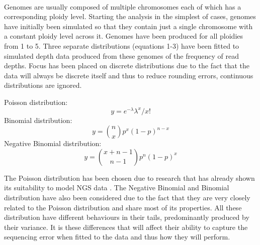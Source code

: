 \documentclass[11pt]{article}
\begin{document}
\paragraph{}Genomes are usually composed of multiple chromosomes each of which has a corresponding ploidy level. Starting the analysis in the simplest of cases, genomes have initially been simulated so that they contain just a single chromosome with a constant ploidy level across it. Genomes have been produced for all ploidies from 1 to 5. Three separate distributions (equations 1-3) have been fitted to simulated depth data produced from these genomes of the frequency of read depths. Focus has been placed on discrete distributions due to the fact that the data will always be discrete itself and thus to reduce rounding errors, continuous distributions are ignored.
\begin{center}
Poisson distribution:
\begin{equation}
y=e^{-\lambda}\lambda^{x}/x!
\end{equation}
Binomial distribution:
\begin{equation}
y=\binom{n}{x}p^{x}(1-p)^{n-x}
\end{equation}
Negative Binomial distribution:
\begin{equation}
y=\binom{x+n-1}{n-1}p^{n}(1-p)^{x}
\end{equation}
\end{center}
The Poisson distribution has been chosen due to research that has already shown its suitability to model NGS data \autocite{Schwarzbauer2010}. The Negative Binomial and Binomial distribution have also been considered due to the fact that they are very closely related to the Poisson distribution and share most of its properties. All these distribution have different behaviours in their tails, predominantly produced by their variance. It is these differences that will affect their ability to capture the sequencing error when fitted to the data and thus how they will perform.
\end{document}
